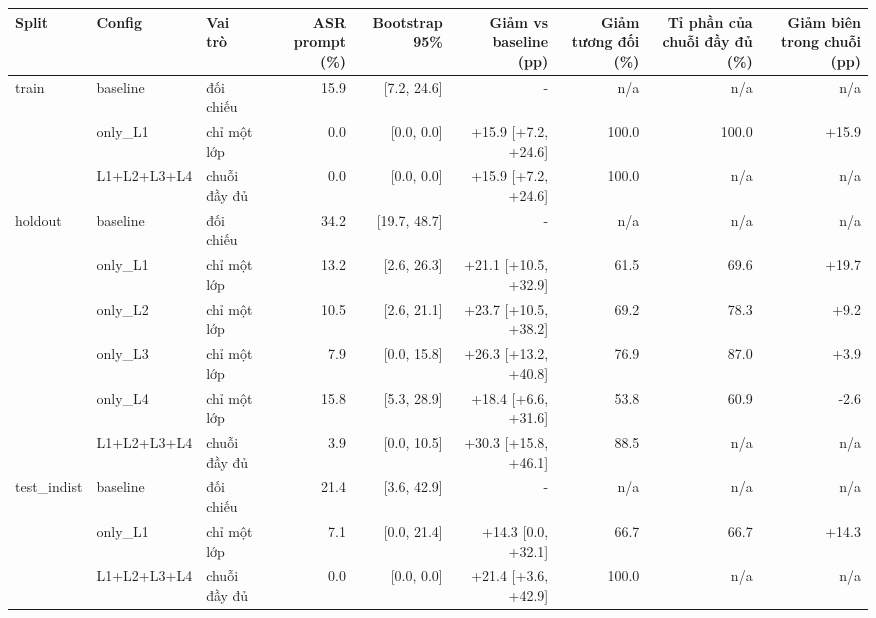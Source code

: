 \begin{tabular}{lllrrrrrr}
\toprule
Split & Config & Vai trò & ASR prompt (\%) & Bootstrap 95\% & Giảm vs baseline (pp) & Giảm tương đối (\%) & Tỉ phần của chuỗi đầy đủ (\%) & Giảm biên trong chuỗi (pp) \\
\midrule
train & baseline & đối chiếu & 15.9 & [7.2, 24.6] & - & n/a & n/a & n/a \\
 & only\_L1 & chỉ một lớp & 0.0 & [0.0, 0.0] & +15.9 [+7.2, +24.6] & 100.0 & 100.0 & +15.9 \\
 & L1+L2+L3+L4 & chuỗi đầy đủ & 0.0 & [0.0, 0.0] & +15.9 [+7.2, +24.6] & 100.0 & n/a & n/a \\
\midrule
holdout & baseline & đối chiếu & 34.2 & [19.7, 48.7] & - & n/a & n/a & n/a \\
 & only\_L1 & chỉ một lớp & 13.2 & [2.6, 26.3] & +21.1 [+10.5, +32.9] & 61.5 & 69.6 & +19.7 \\
 & only\_L2 & chỉ một lớp & 10.5 & [2.6, 21.1] & +23.7 [+10.5, +38.2] & 69.2 & 78.3 & +9.2 \\
 & only\_L3 & chỉ một lớp & 7.9 & [0.0, 15.8] & +26.3 [+13.2, +40.8] & 76.9 & 87.0 & +3.9 \\
 & only\_L4 & chỉ một lớp & 15.8 & [5.3, 28.9] & +18.4 [+6.6, +31.6] & 53.8 & 60.9 & -2.6 \\
 & L1+L2+L3+L4 & chuỗi đầy đủ & 3.9 & [0.0, 10.5] & +30.3 [+15.8, +46.1] & 88.5 & n/a & n/a \\
\midrule
test\_indist & baseline & đối chiếu & 21.4 & [3.6, 42.9] & - & n/a & n/a & n/a \\
 & only\_L1 & chỉ một lớp & 7.1 & [0.0, 21.4] & +14.3 [0.0, +32.1] & 66.7 & 66.7 & +14.3 \\
 & L1+L2+L3+L4 & chuỗi đầy đủ & 0.0 & [0.0, 0.0] & +21.4 [+3.6, +42.9] & 100.0 & n/a & n/a \\
\bottomrule
\end{tabular}
